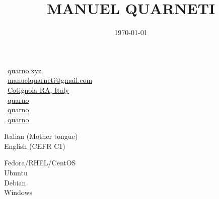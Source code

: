 \documentclass{article}
\title{\HUGE \textbf{MANUEL QUARNETI} \\[-20pt]}
\author{}
\date{\today}
\begin{document}
\setmainfont{Inter}

\setlength{\columnsep}{20pt}
\begin{paracol}{2}

\begin{tcolorbox}[colback=white,arc=0pt]
    \vspace{10pt}

    \begin{center}
    \end{center}

    \vspace{0pt}

    \tcblower
    \small

    \faGlobe \ \href{https://quarno.xyz/}{quarno.xyz} \\[8pt]
    \faEnvelope \ \href{mailto:manuelquarneti@gmail.com}{manuelquarneti@gmail.com} \\[8pt]
    \faCity \ \href{https://www.openstreetmap.org/relation/43112}{Cotignola RA, Italy} \\[8pt]
    \faGithub \ \href{https://github.com/quarno}{quarno} \\[8pt]
    \faLinkedin \ \href{https://www.linkedin.com/in/quarno}{quarno} \\[8pt]
    \faTelegram \ \href{https://t.me/quarno}{quarno}
\end{tcolorbox}

\vspace{35pt}

\begin{tcolorbox}[title=\faLanguage \ Languages,colback=white,arc=0pt]
     Italian (Mother tongue) \\[4pt]
     English (CEFR C1)
\end{tcolorbox}

\begin{tcolorbox}[title=\faServer \ Operating Systems,colback=white,arc=0pt]
     Fedora/RHEL/CentOS \\[4pt]
     Ubuntu \\[4pt]
     Debian \\[4pt]
     Windows
\end{tcolorbox}


\end{paracol}
\end{document}

